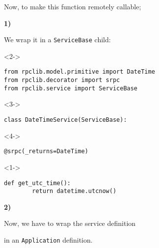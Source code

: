 \documentclass{beamer}
\begin{document}
\begin{frame}
  \LARGE

  Now, to make this function remotely callable;

  \bigskip

\pause

  \color{red} \textbf{1)} \color{black}


    \begin{center}
      We wrap it in a \texttt{ServiceBase} child:
    \end{center}

\end{frame}

\begin{frame}[fragile]
\begin{uncoverenv}<2->
  \begin{lstlisting}[frame=none]
from rpclib.model.primitive import DateTime
from rpclib.decorator import srpc
from rpclib.service import ServiceBase
  \end{lstlisting}
\end{uncoverenv}
\begin{uncoverenv}<3->
  \begin{lstlisting}[frame=none]
class DateTimeService(ServiceBase):
  \end{lstlisting}
  \vspace{-13pt}
\end{uncoverenv}
\begin{uncoverenv}<4->
  \begin{lstlisting}[frame=none]
    @srpc(_returns=DateTime)
  \end{lstlisting}
  \vspace{-13pt}
\end{uncoverenv}
\begin{uncoverenv}<1->
  \begin{lstlisting}[frame=none]
    def get_utc_time():
        return datetime.utcnow()
  \end{lstlisting}
\end{uncoverenv}
\end{frame}

\begin{frame}
  \LARGE

  \color{red} \textbf{2)} \color{black}

  \begin{center}
    Now, we have to wrap the service definition

    \bigskip

    in an \texttt{Application} definition.

  \end{center}

\end{frame}
\end{document}
